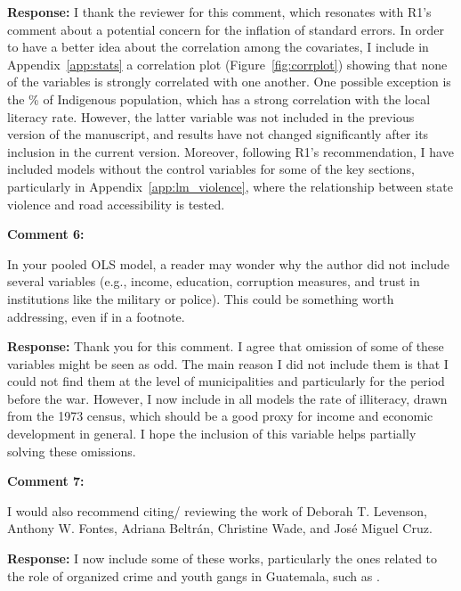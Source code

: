 \documentclass[12pt, a4paper, notitlepage]{article}
\begin{document}
\noindent\textbf{Response:} I thank the reviewer for this comment, which resonates with R1's comment about a potential concern for the inflation of standard errors. In order to have a better idea about the correlation among the covariates, I include in Appendix~\ref{app:stats} a correlation plot (Figure~\ref{fig:corrplot}) showing that none of the variables is strongly correlated with one another. One possible exception is the \% of Indigenous population, which has a strong correlation with the local literacy rate. However, the latter variable was not included in the previous version of the manuscript, and results have not changed significantly after its inclusion in the current version.
Moreover, following R1's recommendation, I have included models without the control variables for some of the key sections, particularly in Appendix~\ref{app:lm_violence}, where the relationship between state violence and road accessibility is tested.

\vspace{15pt}
\noindent\textbf{Comment 6:}
\begin{displayquote}
In your pooled OLS model, a reader may wonder why the author did not include several variables (e.g., income, education, corruption measures, and trust in institutions like the military or police). This could be something worth addressing, even if in a footnote.
\end{displayquote}

\noindent\textbf{Response:} Thank you for this comment. I agree that omission of some of these variables might be seen as odd. The main reason I did not include them is that I could not find them at the level of municipalities and particularly for the period before the war. However, I now include in all models the rate of illiteracy, drawn from the 1973 census, which should be a good proxy for income and economic development in general. I hope the inclusion of this variable helps partially solving these omissions.

\vspace{15pt}
\noindent\textbf{Comment 7:}
\begin{displayquote}
I would also recommend citing/ reviewing the work of Deborah T. Levenson, Anthony W. Fontes, Adriana Beltrán, Christine Wade, and José Miguel Cruz.
\end{displayquote}

\noindent\textbf{Response:} I now include some of these works, particularly the ones related to the role of organized crime and youth gangs in Guatemala, such as \citet{Peacock:2003tt, Beltran:2016td, Booth:2010wd, Levenson:2013tm}.

\newpage


\end{document}
